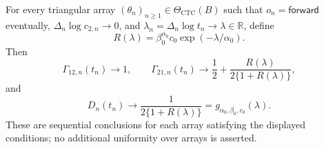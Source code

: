 For every triangular array \((\theta_n)_{n\geq1}\in\Theta_{\mathrm{CTC}}(B)\) such that \(o_n=\mathsf{forward}\) eventually, \(\Delta_n\log c_{2,n}\to0\), and \(\lambda_n=\Delta_n\log t_n\to\lambda\in\mathbb R\), define
\[
R(\lambda)=\beta_0^{\alpha_0}c_0\exp(-\lambda/\alpha_0).
\]
Then
\[
\Gamma_{12,n}(t_n)\to1,
\qquad
\Gamma_{21,n}(t_n)\to\frac12+\frac{R(\lambda)}{2\{1+R(\lambda)\}},
\]
and
\[
D_n(t_n)\to\frac{1}{2\{1+R(\lambda)\}}
=g_{\alpha_0,\beta_0,c_0}(\lambda).
\]
These are sequential conclusions for each array satisfying the displayed conditions; no additional uniformity over arrays is asserted.